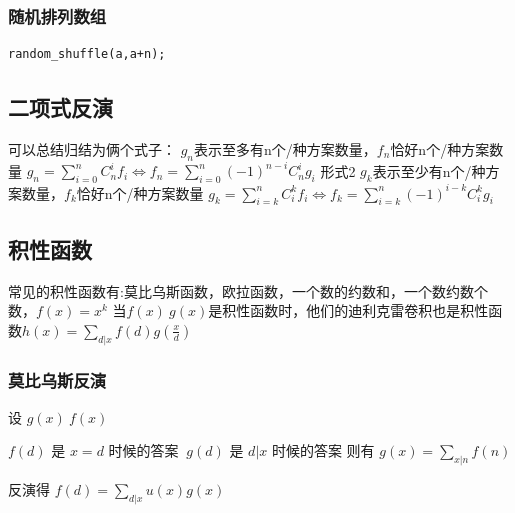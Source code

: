 \documentclass[12pt, a4paper, oneside]{ctexart}
\begin{document}
\subsubsection{随机排列数组} 
\begin{lstlisting}
random_shuffle(a,a+n);
\end{lstlisting}

\newpage 
\subsection{二项式反演} 
可以总结归结为俩个式子：
$g_n$表示至多有n个/种方案数量，$f_n$恰好n个/种方案数量
${g_{n}={\sum_{i=0}^n}{C_n^i}{f_{i}}{\Leftrightarrow}{f_n}={\sum_{i=0}^n(-1)^{n-i}{C_n^i}g_i}}$
形式2
$g_k$表示至少有n个/种方案数量，$f_k$恰好n个/种方案数量
${g_k={\sum_{i=k}^n{C_i^k}f_i}{\Leftrightarrow}f_k={\sum_{i=k}^n(-1)^{i-k}{C_i^k}g_i}}$

\subsection{积性函数} 
常见的积性函数有:莫比乌斯函数，欧拉函数，一个数的约数和，一个数约数个数，$f(x)=x^k$
当$f(x)\ g(x)$是积性函数时，他们的迪利克雷卷积也是积性函数$h(x)={\sum_{d|x}f(d)g(\frac{x}{d})}$
\subsubsection{莫比乌斯反演} 

设 $g(x)\ f(x)$ \par $f(d)$ 是 $x=d$ 时候的答案 $\ g(d)$ 是 $d|x$ 时候的答案   则有 $g(x)=\sum_{x|n}f(n)$ \par 反演得 $f(d)=\sum_{d|x}u(x)g(x)$

\newpage 
\end{document}
